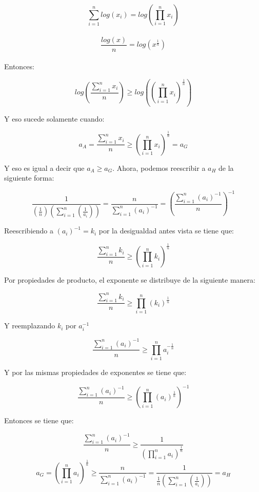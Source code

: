 \documentclass[12pt,a4paper]{report}
\begin{document}
\begin{enumerate}
{		   $$\sum_{i=1}^{n}log(x_{i})=log(\prod_{i=1}^{n}x_{i})$$ \\
		      $$\frac{log(x)}{n}=log(x^{\frac{1}{n}})$$\\
		      Entonces:\\
		      \begin{center}
		     $$log(\frac{\sum_{i=1}^{n}x_{i}}{n})\geq log((\prod_{i=1}^{n}x_{i})^{\frac{1}{n}})
		      $$\end{center}
		      Y eso sucede solamente cuando:\\
		      \begin{center}
		          $$a_{A}=\frac{\sum_{i=1}^{n}x_{i}}{n} \geq (\prod_{i=1}^{n}x_{i})^{\frac{1}{n}}=a_{G}$$
		      \end{center}
		      Y eso es igual a decir que $a_{A}\geq a_{G}$. Ahora, podemos reescribir a $a_{H}$ de la siguiente forma:\\
		      \begin{center}
		          $$\frac{1}{(\frac{1}{n})(\sum_{i=1}^{n}(\frac{1}{a_{i}}))}=\frac{n}{\sum_{i=1}^{n}(a_{i})^{-1}}=(\frac{\sum_{i=1}^{n}(a_{i})^{-1}}{n})^{-1}$$
		      \end{center}
		      Reescribiendo a $(a_{i})^{-1}=k_{i}$ por la desigualdad antes vista se tiene que:\\
		      \begin{center}
		          $$\frac{\sum_{i=1}^{n}k_{i}}{n}\geq (\prod_{i=1}^{n}k_{i})^{\frac{1}{n}}$$
		      \end{center}
		      Por propiedades de producto, el exponente se distribuye de la siguiente manera:\\
		      \begin{center}
		          $$\frac{\sum_{i=1}^{n}k_{i}}{n}\geq \prod_{i=1}^{n}(k_{i})^{\frac{1}{n}}$$
		      \end{center}
		      Y reemplazando $k_{i}$ por $a_{i}^{-1}$\\
		      \begin{center}
		          $$\frac{\sum_{i=1}^{n}(a_{i})^{-1}}{n} \geq \prod_{i=1}^{n}a_{i}^{-\frac{1}{n}}$$
		      \end{center}
		      Y por las mismas propiedades de exponentes se tiene que:\\
		      \begin{center}
		          $$\frac{\sum_{i=1}^{n}(a_{i})^{-1}}{n}\geq (\prod_{i=1}^{n}(a_{i})^{\frac{1}{n}})^{-1}$$
		      \end{center}

		      Entonces se tiene que:\\
		      \begin{center}
		          $$\frac{\sum_{i=1}^{n}(a_{i})^{-1}}{n}\geq \frac{1}{(\prod_{i=1}^{n}a_{i})^{\frac{1}{n}}}$$
		          $$a_{G}=(\prod_{i=1}^{n}a_{i})^{\frac{1}{n}}\geq \frac{n}{\sum_{i=1}^{n}(a_{i})^{-1}}=\frac{1}{\frac{1}{n}(\sum_{i=1}^{n}(\frac{1}{a_{i}}))}=a_{H}$$


\end{center}}
\end{enumerate}
\end{document}
